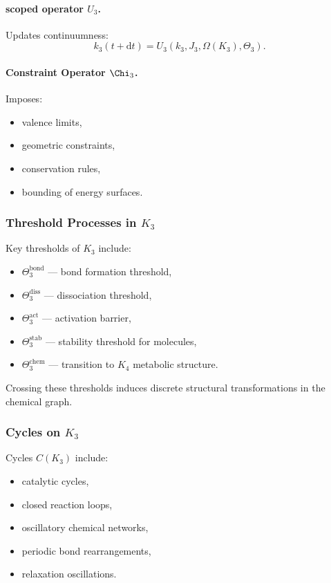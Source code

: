 \paragraph{scoped operator \texorpdfstring{$U_3$}{U_3}.}
Updates continuumness:
\[
k_3(t+\mathrm{d}t) = U_3(k_3, J_3, \Omega(K_3), \Theta_3).
\]

\paragraph{Constraint Operator \texorpdfstring{$\Chi_3$}{\Chi_3}.}
Imposes:
\begin{itemize}
    \item valence limits,
    \item geometric constraints,
    \item conservation rules,
    \item bounding of energy surfaces.
\end{itemize}

\subsubsection{Threshold Processes in \texorpdfstring{$K_3$}{K_3}}

Key thresholds of $K_3$ include:

\begin{itemize}
    \item $\Theta_3^{\text{bond}}$ — bond formation threshold,
    \item $\Theta_3^{\text{diss}}$ — dissociation threshold,
    \item $\Theta_3^{\text{act}}$ — activation barrier,
    \item $\Theta_3^{\text{stab}}$ — stability threshold for molecules,
    \item $\Theta_3^{\text{chem}}$ — transition to $K_4$ metabolic structure.
\end{itemize}

Crossing these thresholds induces discrete structural transformations in 
the chemical graph.

\subsubsection{Cycles on \texorpdfstring{$K_3$}{K_3}}

Cycles $C(K_3)$ include:
\begin{itemize}
    \item catalytic cycles,
    \item closed reaction loops,
    \item oscillatory chemical networks,
    \item periodic bond rearrangements,
    \item relaxation oscillations.
\end{itemize}

